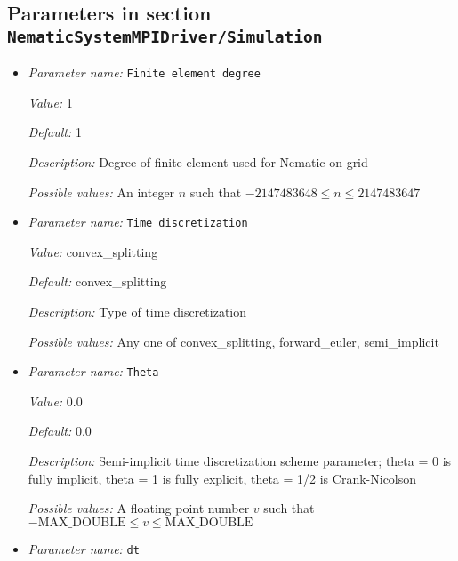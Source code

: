 \subsection{Parameters in section \tt NematicSystemMPIDriver/Simulation}
\label{parameters:NematicSystemMPIDriver/Simulation}

\begin{itemize}
\item {\it Parameter name:} {\tt Finite element degree}
\label{parameters:NematicSystemMPIDriver/Simulation/Finite element degree}
\label{parameters:NematicSystemMPIDriver/Simulation/Finite_20element_20degree}


{\it Value:} 1


{\it Default:} 1


{\it Description:} Degree of finite element used for Nematic on grid


{\it Possible values:} An integer $n$ such that $-2147483648\leq n \leq 2147483647$
\item {\it Parameter name:} {\tt Time discretization}
\label{parameters:NematicSystemMPIDriver/Simulation/Time discretization}
\label{parameters:NematicSystemMPIDriver/Simulation/Time_20discretization}


{\it Value:} convex\_splitting


{\it Default:} convex\_splitting


{\it Description:} Type of time discretization


{\it Possible values:} Any one of convex\_splitting, forward\_euler, semi\_implicit
\item {\it Parameter name:} {\tt Theta}
\label{parameters:NematicSystemMPIDriver/Simulation/Theta}


{\it Value:} 0.0


{\it Default:} 0.0


{\it Description:} Semi-implicit time discretization scheme parameter; theta = 0 is fully implicit, theta = 1 is fully explicit, theta = 1/2 is Crank-Nicolson


{\it Possible values:} A floating point number $v$ such that $-\text{MAX\_DOUBLE} \leq v \leq \text{MAX\_DOUBLE}$
\item {\it Parameter name:} {\tt dt}
\label{parameters:NematicSystemMPIDriver/Simulation/dt}



\end{itemize}
